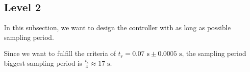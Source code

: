\subsection*{Level 2}

In this subsection, we want to design the controller with as long as possible sampling period. 

Since we want to fulfill the criteria of $t_r = 0.07 \text{ s} \pm 0.0005 \text{ s}$, the sampling period biggest sampling period is $\frac{t_r}{4} \approx 17 \text{ s}$.  

